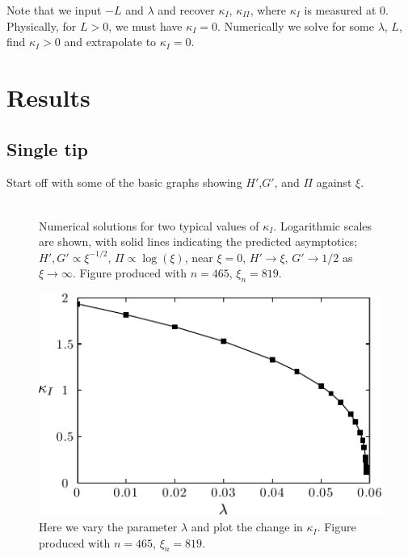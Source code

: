 \documentclass{jfm}
\begin{document}
Note that we input $-L$ and $\lambda$ and recover $\kappa_I$, $\kappa_{II}$, where 
$\kappa_I$ is measured at $0$. Physically, for $L>0$, we must have
$\kappa_I=0$. Numerically we solve for some $\lambda$, $L$, find $\kappa_I >0$ 
and extrapolate to $\kappa_I=0$.


%
%
% 
\clearpage
\section{Results}\label{sec:Results}
%
%
%
\subsection{Single tip}
Start off with some of the basic graphs showing $H'$,$G'$, and $\Pi$ against
$\xi$.
\begin{figure}
  \centerline{\includegraphics{./../../Graphs/hprime-p-x-full.pdf}}
  \caption{Numerical solutions for two typical values of $\kappa_I$. 
           Logarithmic scales are shown, with solid lines indicating the 
           predicted asymptotics; $H', G' \propto \xi^{-1/2}$, 
           $\Pi \propto \log(\xi)$, near $\xi=0$, 
           $H' \to \xi$, $G'\to 1/2$ as $\xi \to \infty$. 
           Figure produced with $n=465$, $\xi_n=819$.}
\end{figure}
\begin{figure}
  \centerline{\includegraphics{./../../Graphs/K-lambda-edited.pdf}}
  \caption{Here we vary the parameter $\lambda$ and plot the change in 
           $\kappa_I$. Figure produced with $n=465$, $\xi_n = 819$.}
\end{figure}
\end{document}
